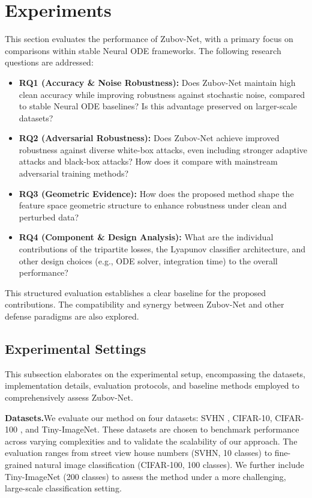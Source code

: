 \documentclass[journal]{IEEEtran}
\begin{document}
\section{Experiments}
This section evaluates the performance of Zubov-Net, with a primary focus on comparisons within stable Neural ODE frameworks. The following research questions are addressed:
\begin{itemize}
	\item \textbf{RQ1 (Accuracy \& Noise Robustness):} Does Zubov-Net maintain high clean accuracy while improving robustness against stochastic noise, compared to stable Neural ODE baselines? Is this advantage preserved on larger-scale datasets?
	
	\item \textbf{RQ2 (Adversarial Robustness):} Does Zubov-Net achieve improved robustness against diverse white-box attacks, even including stronger adaptive attacks and black-box attacks? How does it compare with mainstream adversarial training methods?

	\item \textbf{RQ3 (Geometric Evidence):} How does the proposed method shape the feature space geometric structure to enhance robustness under clean and perturbed data?
	
	\item \textbf{RQ4 (Component \& Design Analysis):} What are the individual contributions of the tripartite losses, the Lyapunov classifier architecture, and other design choices (e.g., ODE solver, integration time) to the overall performance?
\end{itemize}

This structured evaluation establishes a clear baseline for the proposed contributions. The compatibility and synergy between Zubov-Net and other defense paradigms are also explored.

\subsection{Experimental Settings}
This subsection elaborates on the experimental setup, encompassing the datasets, implementation details, evaluation protocols, and baseline methods employed to comprehensively assess Zubov-Net.


\noindent \textbf{Datasets.}\quad We evaluate our method on four datasets: SVHN \cite{netzer2011reading}, CIFAR-10, CIFAR-100 \cite{krizhevsky2009learning}, and Tiny-ImageNet. These datasets are chosen to benchmark performance across varying complexities and to validate the scalability of our approach. The evaluation ranges from street view house numbers (SVHN, 10 classes) to fine-grained natural image classification (CIFAR-100, 100 classes). We further include Tiny-ImageNet (200 classes) to assess the method under a more challenging, large-scale classification setting. 
\end{document}
